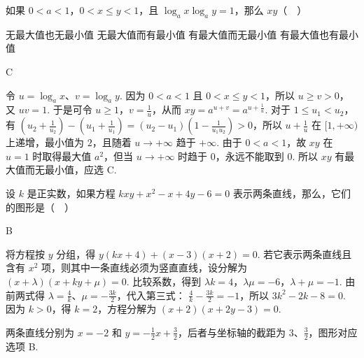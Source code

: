 \documentclass[UTF8,a4paper,oneside,11pt]{ctexbook}
\begin{document}
\begin{problem}
如果 \(0<a<1\)，\(0<x\leqslant y<1\)，且 \(\log_a x\log_a y=1\)，那么 \(xy\)（\(\quad\)）

\choices
    {无最大值也无最小值}
    {无最大值而有最小值}
    {有最大值而无最小值}
    {有最大值也有最小值}
\end{problem}

\begin{answer}
C
\end{answer}

\begin{solution}
令 \(u=\log_a x\)、\(v=\log_a y\). 因为 \(0<a<1\) 且 \(0<x\leqslant y<1\)，所以 \(u\geqslant v>0\)，又 \(uv=1\). 于是可令 \(u\geqslant1\)，\(v=\frac1u\)，从而
\(xy=a^{u+v}=a^{u+\frac{1}{u}}\). 对于 \(1\leqslant u_1<u_2\)，有
\(\left(u_2+\frac1{u_2}\right)-\left(u_1+\frac1{u_1}\right)=(u_2-u_1)\left(1-\frac1{u_1u_2}\right)>0\)，所以 \(u+\frac1u\) 在 \([1,+\infty)\) 上递增，最小值为 \(2\)，且随着 \(u\to+\infty\) 趋于 \(+\infty\). 由于 \(0<a<1\)，故 \(xy\) 在 \(u=1\) 时取得最大值 \(a^2\)，但当 \(u\to+\infty\) 时趋于 \(0\)，永远不能取到 \(0\). 所以 \(xy\) 有最大值而无最小值，应选 C.
\end{solution}

\begin{problem}
设 \(k\) 是正实数，如果方程 \(kxy+x^2-x+4y-6=0\) 表示两条直线，那么，它们的图形是（\(\quad\)）

\choices
    {}
    {}
    {}
    {}
\end{problem}

\begin{answer}
B
\end{answer}

\begin{solution}
将方程按 \(y\) 分组，得
\(y(kx+4)+(x-3)(x+2)=0\). 若它表示两条直线且含有 \(x^2\) 项，则其中一条直线必须为竖直直线，设分解为
\((x+\lambda)(x+ky+\mu)=0\). 比较系数，得到
\(\lambda k=4\)，\(\lambda\mu=-6\)，\(\lambda+\mu=-1\). 由前两式得 \(\lambda=\frac4k\)、\(\mu=-\frac{3k}{2}\)，代入第三式：
\(\frac4k-\frac{3k}{2}=-1\)，所以 \(3k^2-2k-8=0\). 因为 \(k>0\)，得 \(k=2\)，方程分解为
\((x+2)(x+2y-3)=0\).

两条直线分别为 \(x=-2\) 和 \(y=-\frac12x+\frac32\)，后者与坐标轴的截距为 \(3\)、\(\frac32\)，图形对应选项 B.
\end{solution}
\end{document}
